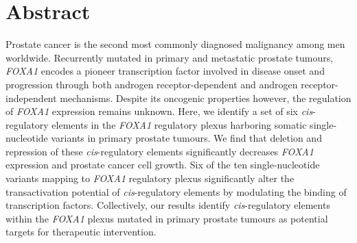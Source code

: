\section{Abstract}

Prostate cancer is the second most commonly diagnosed malignancy among men worldwide.
Recurrently mutated in primary and metastatic prostate tumours, \emph{FOXA1} encodes a pioneer transcription factor involved in disease onset and progression through both androgen receptor-dependent and androgen receptor-independent mechanisms.
Despite its oncogenic properties however, the regulation of \emph{FOXA1} expression remains unknown.
Here, we identify a set of six \emph{cis}-regulatory elements in the \emph{FOXA1} regulatory plexus harboring somatic single-nucleotide variants in primary prostate tumours.
We find that deletion and repression of these \emph{cis}-regulatory elements significantly decreases \emph{FOXA1} expression and prostate cancer cell growth.
Six of the ten single-nucleotide variants mapping to \emph{FOXA1} regulatory plexus significantly alter the transactivation potential of \emph{cis}-regulatory elements by modulating the binding of transcription factors.
Collectively, our results identify \emph{cis}-regulatory elements within the \emph{FOXA1} plexus mutated in primary prostate tumours as potential targets for therapeutic intervention.
